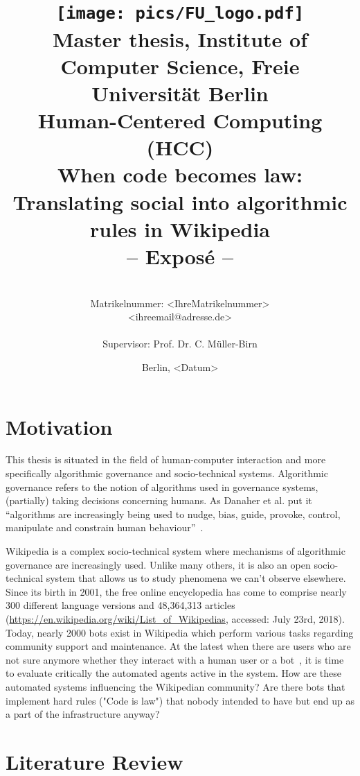 \documentclass[pdftex,a4paper,11pt]{scrartcl}
\title{\texttt{[image: pics/FU\_logo.pdf]}\\
{\small Master thesis, Institute of Computer Science, Freie Universität Berlin}\\
{\small Human-Centered Computing (HCC)}\\
[6ex]
{\LARGE When code becomes law: Translating social into algorithmic rules in Wikipedia}\\
{\normalsize-- Exposé --}}
\author{
{\emph{\normalsize<Ihr Vor- und Nachname>}}\\
{\normalsize Matrikelnummer: <IhreMatrikelnummer>}\\
{\normalsize <ihreemail@adresse.de>}\\\\
{\normalsize Supervisor: Prof. Dr. C. Müller-Birn}
}
\date{\normalsize Berlin, <Datum>}
\newcommand{\blankpage}{
\newpage
\thispagestyle{empty}
\mbox{}
\newpage
}
\begin{document}
\maketitle

\thispagestyle{empty}  %

\blankpage

\setcounter{page}{1} %

\section{Motivation}

This thesis is situated in the field of human-computer interaction and more specifically algorithmic governance and socio-technical systems.
Algorithmic governance refers to the notion of algorithms used in governance systems, (partially) taking decisions concerning humans.
As Danaher et al. put it ``algorithms are increasingly being used to nudge, bias, guide, provoke, control, manipulate and constrain human behaviour''~\cite{DanaherEtAl2017}.

Wikipedia is a complex socio-technical system where mechanisms of algorithmic governance are increasingly used.
Unlike many others, it is also an open socio-technical system that allows us to study phenomena we can't observe elsewhere.
Since its birth in 2001, the free online encyclopedia has come to comprise nearly 300 different language versions and 48,364,313 articles (\url{https://en.wikipedia.org/wiki/List_of_Wikipedias}, accessed: July 23rd, 2018).
Today, nearly 2000 bots exist in Wikipedia which perform various tasks regarding community support and maintenance.
At the latest when there are users who are not sure anymore whether they interact with a human user or a bot~\cite{FordGeiger2012}, it is time to evaluate critically the automated agents active in the system.
How are these automated systems influencing the Wikipedian community?
Are there bots that implement hard rules ("Code is law") that nobody intended to have but end up as a part of the infrastructure anyway?


\section{Literature Review}
\end{document}
